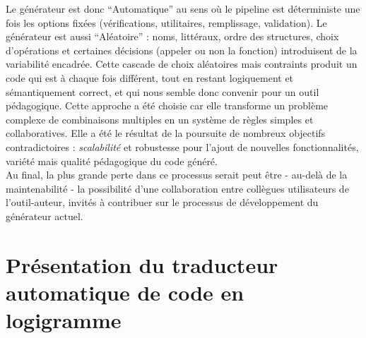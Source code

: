 \documentclass[11pt,a4paper]{article}
\begin{document}
Le générateur est donc ``Automatique'' au sens où le pipeline est déterministe une fois les options fixées (vérifications, utilitaires, remplissage, validation). 
\newline
Le générateur est aussi ``Aléatoire'' : noms, littéraux, ordre des structures, choix d'opérations et certaines décisions (appeler ou non la fonction) introduisent de la variabilité encadrée.
\newline
Cette cascade de choix aléatoires mais contraints produit un code qui est à chaque fois différent, tout en restant logiquement et sémantiquement correct, et qui nous semble donc convenir pour un outil pédagogique. Cette approche a été choisie car elle transforme un problème complexe de combinaisons multiples en un système de règles simples et collaboratives. Elle a été le résultat de la poursuite de nombreux objectifs contradictoires : \textit{scalabilité} et robustesse pour l'ajout de nouvelles fonctionnalités, variété mais qualité pédagogique du code généré. \\ Au final, la plus grande perte dans ce processus serait peut être - au-delà de la maintenabilité - la possibilité d'une collaboration entre collègues utilisateurs de l'outil-auteur, invités à contribuer sur le processus de développement du générateur actuel.

\clearpage
\noindent



\clearpage
\section{Présentation du traducteur automatique de code en logigramme}
\end{document}
